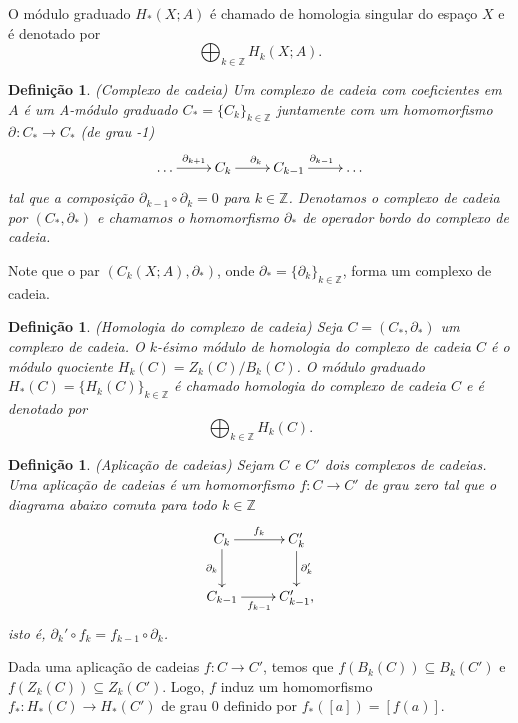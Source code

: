 \documentclass[12pt]{book}
\newtheorem{definicao}[teorema]{Definição}
\newcommand{\bordo}[1]{\partial_{#1}}
\newcommand{\cadeia}[2]{C_{#1}(#2; A)}
\newcommand{\classe}[1]{[#1]}
\newcommand{\colecao}[1]{\{#1_{k} \}_{k\in \inteiros}}
\newcommand{\colecaoabrev}[1]{\{#1 \}_{k\in \inteiros}}
\newcommand{\homologia}[2]{H_{#1}(#2;A)}
\newcommand{\homologiaabrev}[2]{H_{#1}(#2)}
\newcommand{\imagembordoabrev}[2]{B_{#1}(#2)}
\newcommand{\inteiros}{\mathbb{Z}}
\newcommand{\kernelbordoabrev}[2]{Z_{#1}(#2)}
\begin{document}
	O módulo graduado $\homologia{*}{X}$ é chamado de homologia singular do espaço $X$ e é denotado por
	$$
	\bigoplus_{k\in \inteiros}\homologia{k}{X}.
	$$
	
	\begin{definicao}
		(Complexo de cadeia) Um complexo de cadeia com coeficientes em $A$ é um A-módulo graduado $C_{*} = \colecao{C}$ juntamente com um homomorfismo $\bordo{}:C_{*} \to C_{*}$ (de grau -1)
		$$
		\xymatrix{
			\dots \ar[r]^{\bordo{k+1}}  & C_{k} \ar[r]^{\bordo{k}} & C_{k-1}\ar[r]^{\bordo{k-1}} &\dots
		}
		$$
		tal que a composição $\bordo{k-1}\circ\bordo{k} = 0$ para $k \in \inteiros$. Denotamos o complexo de cadeia por $(C_{*}, \bordo{*})$ e chamamos o homomorfismo $\bordo{*}$ de operador bordo do complexo de cadeia.
	\end{definicao}
	
	Note que o par $(\cadeia{k}{X}, \bordo{*})$, onde $\bordo{*}=\colecaoabrev{\bordo{k}}$, forma um complexo de cadeia.
	
	\begin{definicao}
		(Homologia do complexo de cadeia) Seja $C=(C_{*}, \bordo{*})$ um complexo de cadeia. O $k$-ésimo módulo de homologia do complexo de cadeia $C$ é o módulo quociente
		$\homologiaabrev{k}{C} = \kernelbordoabrev{k}{C}/\imagembordoabrev{k}{C}$. O módulo graduado $\homologiaabrev{*}{C} = \colecaoabrev{\homologiaabrev{k}{C}}$ é chamado homologia do complexo de cadeia $C$ e é denotado por
		$$
		\bigoplus_{k\in \inteiros}\homologiaabrev{k}{C}.
		$$				
	\end{definicao}

	\begin{definicao}
		(Aplicação de cadeias) Sejam $C$ e $C'$ dois complexos de cadeias. Uma aplicação de cadeias é um homomorfismo $f:C\to C'$ de grau zero tal que o diagrama abaixo comuta para todo $k \in \inteiros$
		$$
		\xymatrix{
			C_{k}\ar[d]_{\bordo{k}}\ar[r]^{f_{k}}  & C'_{k}\ar[d]^{\bordo{k}'} 
			\\
			C_{k-1}\ar[r]_{f_{k-1}} & C'_{k-1},
		}
		$$
		isto é, $\bordo{k}'\circ f_{k} = f_{k-1}\circ \bordo{k}$.
	\end{definicao}
	
	Dada uma aplicação de cadeias $f:C\to C'$, temos que $f(\imagembordoabrev{k}{C})\subseteq \imagembordoabrev{k}{C'}$ e $f(\kernelbordoabrev{k}{C})\subseteq \kernelbordoabrev{k}{C'}$. Logo, $f$ induz um homomorfismo $f_{*}:\homologiaabrev{*}{C}  \to \homologiaabrev{*}{C'}$ de grau 0 definido por $f_{*}(\classe{a}) = \classe{f(a)}$.
	
\end{document}
